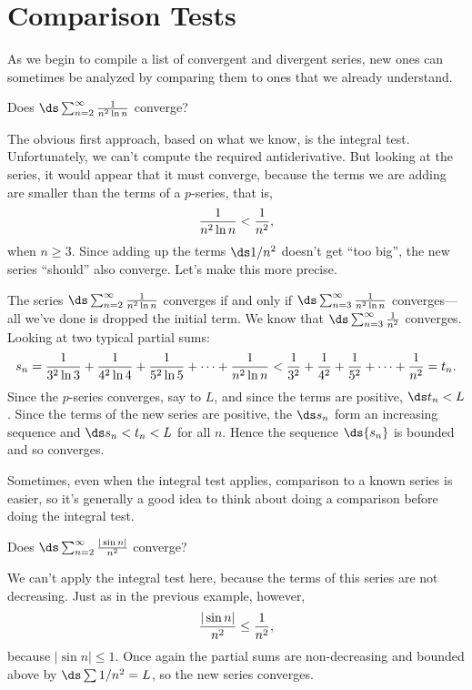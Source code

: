 \section{Comparison Tests}{}{}
\nobreak
As we begin to compile a list of convergent and divergent series, new
ones can sometimes be analyzed by comparing them to ones that we
already understand.

\begin{example} Does $\ds\sum_{n=2}^\infty {1\over n^2\ln n}$ converge?

\ssk
The obvious first approach, based on what we know, is the integral test.
Unfortunately, we can't compute the required antiderivative. But
looking at the series, it would appear that it must converge, because
the terms we are adding are smaller than the terms of a $p$-series,
that is,
$${1\over n^2\ln n}<{1\over n^2},$$
when $n\ge3$. Since adding up the terms $\ds 1/n^2$ doesn't get ``too
big'', the new series ``should'' also converge. Let's make this more
precise.

The series $\ds\sum_{n=2}^\infty {1\over n^2\ln n}$ converges if and
only if $\ds\sum_{n=3}^\infty {1\over n^2\ln n}$ converges---all we've
done is dropped the initial term. We know that 
$\ds\sum_{n=3}^\infty {1\over n^2}$ converges. Looking at two typical
partial sums:
$$
  s_n={1\over 3^2\ln 3}+{1\over 4^2\ln 4}+{1\over 5^2\ln 5}+\cdots+
  {1\over n^2\ln n} < {1\over 3^2}+{1\over 4^2}+
  {1\over 5^2}+\cdots+{1\over n^2}=t_n.
$$
Since the $p$-series converges, say to $L$, and since the terms are positive,
$\ds t_n<L$. Since the terms of the new series are positive, the $\ds s_n$
form an increasing sequence and $\ds s_n<t_n<L$ for all $n$. Hence the
sequence $\ds \{s_n\}$ is bounded and so converges.
\end{example}

Sometimes, even when the integral test applies, comparison to a known
series is easier, so it's generally a good idea to think about doing a
comparison before doing the integral test.

\begin{example} Does $\ds\sum_{n=2}^\infty {|\sin n|\over n^2}$ converge?

\ssk
We can't apply the integral test here, because the terms of this
series are not decreasing. Just as in the previous example, however,
$$ {|\sin n|\over n^2}\le {1\over n^2},$$
because $|\sin n|\le 1$. Once again the partial sums are
non-decreasing and bounded above by $\ds \sum 1/n^2=L$, so the new series
converges. 
\end{example}
\label{example:absolute sine over n squared}

